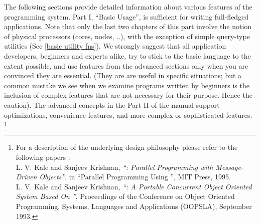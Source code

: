 The following sections provide detailed information about various features of the
\charm programming system. Part I, ``Basic Usage'', is sufficient
for writing full-fledged applications. Note that only the last two
chapters of this part involve the notion of physical processors
(cores, nodes, ..), with the exception of simple query-type utilities
(Sec \ref{basic utility fns}). We strongly suggest that all
application developers, beginners and experts alike, try to stick to
the basic language to the extent possible, and use features from the
advanced sections only when you are convinced they are
essential. (They are are useful in specific situations; but a common
mistake we see when we examine programs written by beginners is the
inclusion of complex features that are not necessary for their
purpose. Hence the caution). The advanced concepts in the Part II of
the manual support optimizations, convenience features, and more
complex or sophisticated features. \footnote{For a description of the underlying design
philosophy please refer to the following papers :\\
    L. V. Kale and Sanjeev Krishnan,
    {\em ``\charm : Parallel Programming with Message-Driven Objects''},
    in ``Parallel Programming Using \CC'',
    MIT Press, 1995. \\
    L. V. Kale and Sanjeev Krishnan,
    {\em ``\charm : A Portable Concurrent Object Oriented System
    Based On \CC''},
    Proceedings of the Conference on Object Oriented Programming,
    Systems, Languages and Applications (OOPSLA), September 1993.
}
